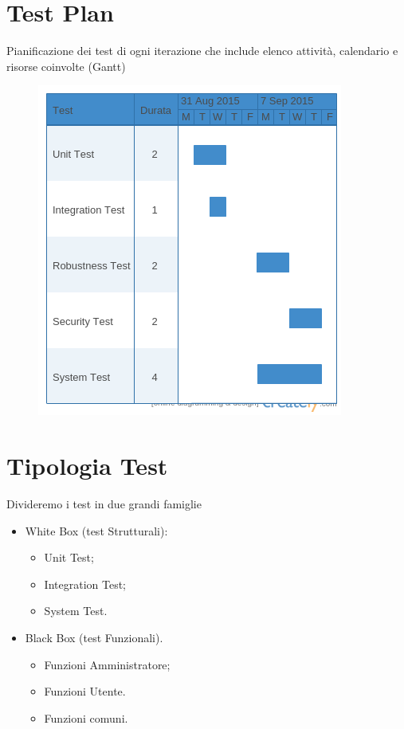 \documentclass[a4paper,12pt]{article}
\begin{document}
\pagebreak

\section{Test Plan}
Pianificazione dei test di ogni iterazione che include elenco attività, calendario e risorse coinvolte (Gantt)
\begin{figure}[ht]
\centering
\includegraphics[trim={0 0.5cm 0 0}, clip, scale=0.5]{test.png}
\end{figure}

\section{Tipologia Test}
Divideremo i test in due grandi famiglie
\begin{itemize}	

\item White Box (test Strutturali):
\begin{itemize}	

\item Unit Test;
\item Integration Test;
\item System Test.

\end{itemize}

\item Black Box (test Funzionali).

\begin{itemize}	

\item Funzioni Amministratore;
\item Funzioni Utente.
\item Funzioni comuni.

\end{itemize}

\end{itemize}
\end{document}
